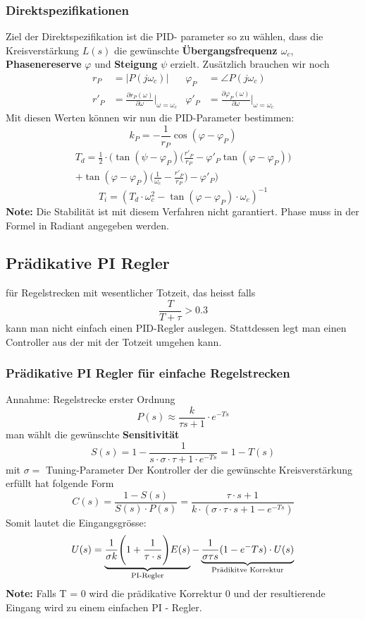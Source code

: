     \subsubsection{Direktspezifikationen} 
        Ziel der Direktspezifikation ist die PID- parameter so zu wählen, dass die Kreisverstärkung $L(s)$ die gewünschte \textbf{Übergangsfrequenz $\omega_c$}, \textbf{Phasenereserve} $\varphi$ und \textbf{Steigung} $\psi$ erzielt. Zusätzlich brauchen wir noch 
        \begin{align*}
        r_P &= |P(j\omega_c)|   &   \varphi_P &= \angle P(j\omega_c)\\
        r'_P &= \frac{\partial r_P(\omega)}{\partial\omega}\Bigg|_{\omega=\omega_c} & \varphi'_P &= \frac{\partial \varphi_P(\omega)}{\partial\omega}\Bigg |_{\omega=\omega_c}
        \end{align*}
        Mit diesen Werten können wir nun die PID-Parameter bestimmen:
        \[k_P = - \frac{1}{r_P}\cos(\varphi-\varphi_P)\]
        \begin{multline*}
        T_d =\frac{1}{2}\cdot\Bigg(\tan(\psi-\varphi_P)\Bigg(\frac{r'_P}{r_P}-\varphi'_P\tan(\varphi-\varphi_P)\Bigg)\\ + \tan(\varphi-\varphi_P) \Bigg(\frac{1}{\omega_c}-\frac{r'_P}{r_P}\Bigg)- \varphi'_P\Bigg)
        \end{multline*}
        \[T_i = (T_d\cdot \omega_c^2 - \tan(\varphi-\varphi_P)\cdot \omega_c)^{-1}\]
        \textbf{Note:} Die Stabilität ist mit diesem Verfahren nicht garantiert. Phase muss in der Formel in Radiant angegeben werden. 
\subsection{Prädikative PI Regler}
    für Regelstrecken mit wesentlicher Totzeit, das heisst falls 
    \[\frac{T}{T+\tau}>0.3\]
    kann man nicht einfach einen PID-Regler auslegen. Stattdessen legt man einen Controller aus der mit der Totzeit umgehen kann. 

    
    \subsubsection{Prädikative PI Regler für einfache Regelstrecken}
        Annahme: Regelstrecke erster Ordnung 
        \[P(s)\approx \frac{k}{\tau s + 1}\cdot e^{-Ts}\]
        man wählt die gewünschte \textbf{Sensitivität} 
        \[S(s) = 1- \frac{1}{s\cdot\sigma\cdot \tau + 1 \cdot e^{-Ts}} = 1 - T(s) \]
        mit $\sigma = $ Tuning-Parameter
        Der Kontroller der die gewünschte Kreisverstärkung erfüllt hat folgende Form 
        \[C(s) =\frac{1-S(s)}{S(s)\cdot P(s)}= \frac{\tau\cdot s+1}{k\cdot(\sigma\cdot\tau\cdot s+ 1-e^{-Ts})}\]
        Somit lautet die Eingangsgrösse: 
        \[U(s)=\underbrace{\frac{1}{\sigma k}\Bigg(1+\frac{1}{\tau\cdot s}\Bigg)E(s)}_{\textnormal{PI-Regler}} - \underbrace{\frac{1}{\sigma\tau s}(1-e^-{Ts})\cdot U(s)}_{\textnormal{Prädikitve Korrektur}}\] 
    \textbf{Note:} Falls T = 0 wird die prädikative Korrektur 0 und der resultierende Eingang wird zu einem einfachen PI - Regler.
